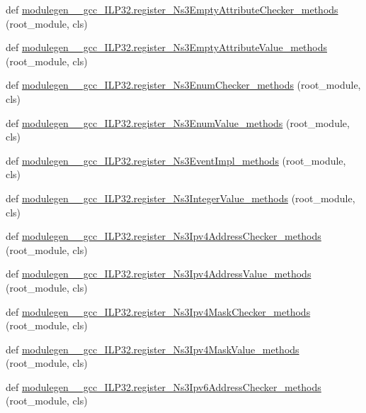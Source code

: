 \begin{DoxyCompactItemize}
\item 
def \hyperlink{namespacemodulegen____gcc__ILP32_a46ed8d8e239b38c1a4353a533fcb77a2}{modulegen\+\_\+\+\_\+gcc\+\_\+\+I\+L\+P32.\+register\+\_\+\+Ns3\+Empty\+Attribute\+Checker\+\_\+methods} (root\+\_\+module, cls)
\item 
def \hyperlink{namespacemodulegen____gcc__ILP32_a4f1a7f7e506590df165bd2f16ec88878}{modulegen\+\_\+\+\_\+gcc\+\_\+\+I\+L\+P32.\+register\+\_\+\+Ns3\+Empty\+Attribute\+Value\+\_\+methods} (root\+\_\+module, cls)
\item 
def \hyperlink{namespacemodulegen____gcc__ILP32_ae5912f10b50cb9b22868a90b1a8af6ff}{modulegen\+\_\+\+\_\+gcc\+\_\+\+I\+L\+P32.\+register\+\_\+\+Ns3\+Enum\+Checker\+\_\+methods} (root\+\_\+module, cls)
\item 
def \hyperlink{namespacemodulegen____gcc__ILP32_ae326f463de72e46c155fc6b4d513b935}{modulegen\+\_\+\+\_\+gcc\+\_\+\+I\+L\+P32.\+register\+\_\+\+Ns3\+Enum\+Value\+\_\+methods} (root\+\_\+module, cls)
\item 
def \hyperlink{namespacemodulegen____gcc__ILP32_a600366111aadb7115136bfec5f8675e7}{modulegen\+\_\+\+\_\+gcc\+\_\+\+I\+L\+P32.\+register\+\_\+\+Ns3\+Event\+Impl\+\_\+methods} (root\+\_\+module, cls)
\item 
def \hyperlink{namespacemodulegen____gcc__ILP32_a4b61c0b25893bff5747f1c50aeb73acb}{modulegen\+\_\+\+\_\+gcc\+\_\+\+I\+L\+P32.\+register\+\_\+\+Ns3\+Integer\+Value\+\_\+methods} (root\+\_\+module, cls)
\item 
def \hyperlink{namespacemodulegen____gcc__ILP32_a91bc88170d5111bf6c9c0defc82f9018}{modulegen\+\_\+\+\_\+gcc\+\_\+\+I\+L\+P32.\+register\+\_\+\+Ns3\+Ipv4\+Address\+Checker\+\_\+methods} (root\+\_\+module, cls)
\item 
def \hyperlink{namespacemodulegen____gcc__ILP32_a9b966337400674f232afe6830aa55a11}{modulegen\+\_\+\+\_\+gcc\+\_\+\+I\+L\+P32.\+register\+\_\+\+Ns3\+Ipv4\+Address\+Value\+\_\+methods} (root\+\_\+module, cls)
\item 
def \hyperlink{namespacemodulegen____gcc__ILP32_a0c8c90b61f4e832ecf41510f18e20e98}{modulegen\+\_\+\+\_\+gcc\+\_\+\+I\+L\+P32.\+register\+\_\+\+Ns3\+Ipv4\+Mask\+Checker\+\_\+methods} (root\+\_\+module, cls)
\item 
def \hyperlink{namespacemodulegen____gcc__ILP32_aa0677871460e65b32fe90ab9bef43b9f}{modulegen\+\_\+\+\_\+gcc\+\_\+\+I\+L\+P32.\+register\+\_\+\+Ns3\+Ipv4\+Mask\+Value\+\_\+methods} (root\+\_\+module, cls)
\item 
def \hyperlink{namespacemodulegen____gcc__ILP32_aed7bbb9a518f22e7091964769eb4c4d3}{modulegen\+\_\+\+\_\+gcc\+\_\+\+I\+L\+P32.\+register\+\_\+\+Ns3\+Ipv6\+Address\+Checker\+\_\+methods} (root\+\_\+module, cls)

\end{DoxyCompactItemize}

